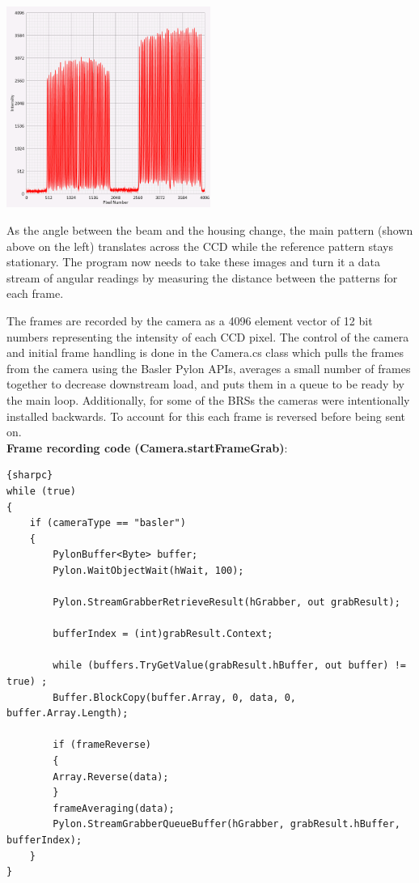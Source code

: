 \documentclass{article}
\begin{document}
\begin{center}
\includegraphics[width=0.5\textwidth]{BRSReadoutScreenPatterns.png}\\
\end{center}

As the angle between the beam and the housing change, the main pattern (shown above on the left) translates across the CCD while the reference pattern stays stationary. The program now needs to take these images and turn it a data stream of angular readings by measuring the distance between the patterns for each frame.

The frames are recorded by the camera as a 4096 element vector of 12 bit numbers representing the intensity of each CCD pixel. The control of the camera and initial frame handling is done in the Camera.cs class which pulls the frames from the camera using the Basler Pylon APIs, averages a small number of frames together to decrease downstream load, and puts them in a queue to be ready by the main loop. Additionally, for some of the BRSs the cameras were intentionally installed backwards. To account for this each frame is reversed before being sent on.\\

\textbf{Frame recording code (Camera.startFrameGrab)}:
\begin{lstlisting}{sharpc}
while (true)
{
	if (cameraType == "basler")
	{
	    PylonBuffer<Byte> buffer;
	    Pylon.WaitObjectWait(hWait, 100);

	    Pylon.StreamGrabberRetrieveResult(hGrabber, out grabResult);

	    bufferIndex = (int)grabResult.Context;

	    while (buffers.TryGetValue(grabResult.hBuffer, out buffer) != true) ;
	    Buffer.BlockCopy(buffer.Array, 0, data, 0, buffer.Array.Length);

	    if (frameReverse)
	    {
		Array.Reverse(data);
	    }
	    frameAveraging(data);
	    Pylon.StreamGrabberQueueBuffer(hGrabber, grabResult.hBuffer, bufferIndex);
	}
}
\end{lstlisting}
\end{document}
